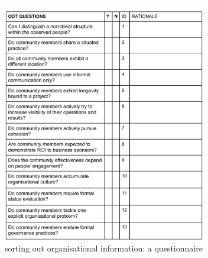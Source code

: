 \documentclass[conference]{IEEEtran}
\begin{document}
\begin{figure}[h!]
\hspace{-.2cm}
\includegraphics[width=3.5in]{quest}%
\caption{sorting out organisational information: a questionnaire}\label{quest}
\end{figure}
\end{document}
